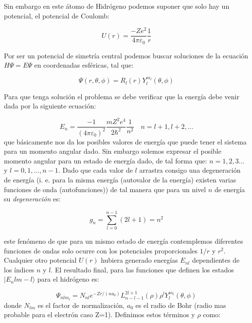 \documentclass[12pt]{article}
\begin{document}
Sin embargo en este átomo de Hidrógeno podemos suponer que solo hay un potencial, el potencial de Coulomb:

\begin{equation}
U(r) = \dfrac{- Z e^2}{4 \pi \varepsilon_0} \dfrac{1}{r}
\end{equation}

Por ser un potencial de simetría central podemos buscar soluciones de la ecuación $H \Psi = E \Psi$  en coordenadas esféricas, tal que:

\begin{equation}
\Psi (r, \theta, \phi ) = R_l(r) Y_l^{m_l} (\theta, \phi)
\end{equation}

Para que tenga solución el problema se debe verificar que la energía debe venir dada por la siguiente ecuación:

\begin{equation}
E_n = \dfrac{-1}{(4 \pi \varepsilon_0)^2} \dfrac{m Z^2 e^4}{2 \hbar^2} \dfrac{1}{n^2} \quad n = l+1, l+2,...
\end{equation}
que básicamente nos da los posibles valores de energía que puede tener el sistema para un momento angular dado. Sin embargo solemos expresar el posible momento angular para un estado de energía dado, de tal forma que: $n=1,2,3...$ y $l=0,1,...,n-1$. Dado que cada valor de $l$ arrastra consigo una degeneración de energía (i. e. para la misma energía (autovalor de la energía) existen varias funciones de onda (autofunciones)) de tal manera que para un nivel $n$ de energía su \textit{degeneración} es:

\begin{equation}
g_n = \sum_{l=0}^{n-1} (2l+1) = n^2
\end{equation}

este fenómeno de que para un mismo estado de energía contemplemos diferentes funciones de ondas solo ocurre con los potenciales proporcionales $1/r$ y $r^2$. Cualquier otro potencial $U(r)$ hubiera generado energías $E_{nl}$ dependientes de los índices $n$ y $l$. El resultado final, para las funciones que definen los estados $| E_n l m-l \rangle$ para el hidrógeno es:

\begin{equation}
\Psi_{n l m_l} = N_{nl} e^{- Z r / (n a_0)} L^{2l+1}_{n-l-1} (\rho) \rho^{l} Y_l^{m_l} (\theta, \phi)
\end{equation}
donde $N_{lm}$ es el factor de normalización, $a_0$ es el radio de Bohr (radio mas probable para el electrón caso Z=1). Definimos estos términos y $\rho$ como:
\end{document}
